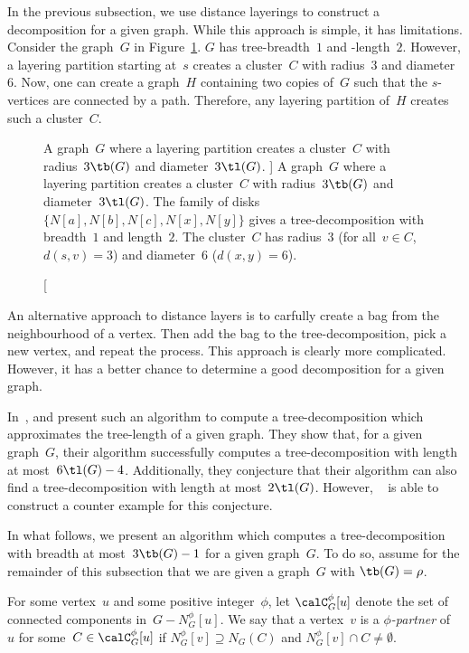 In the previous subsection, we use distance layerings to construct a decomposition for a given graph.
While this approach is simple, it has limitations.
Consider the graph~$G$ in Figure~\ref{fig:LayPartApprox}.
$G$ has tree-breadth~$1$ and -length~$2$.
However, a layering partition starting at~$s$ creates a cluster~$C$ with radius~$3$ and diameter~$6$.
Now, one can create a graph~$H$ containing two copies of~$G$ such that the $s$-vertices are connected by a path.
Therefore, any layering partition of~$H$ creates such a cluster~$C$.

\begin{figure}
    [htb]
    \centering
    
    \caption
    [%
        A graph~$G$ where a layering partition creates a cluster~$C$ with radius~$3 \tb(G)$ and diameter~$3 \tl(G)$.
    ]
    {
        A graph~$G$ where a layering partition creates a cluster~$C$ with radius~$3 \tb(G)$ and diameter~$3 \tl(G)$.
        The family of disks~$\big \{ N[a], N[b], N[c], N[x], N[y] \big \}$ gives a tree-decomposition with breadth~$1$ and length~$2$.
        The cluster~$C$ has radius~$3$ (for all~$v \in C$, $d(s, v) = 3$) and diameter~$6$ ($d(x, y) = 6$).
    }
    \label{fig:LayPartApprox}
\end{figure}

An alternative approach to distance layers is to carfully create a bag from the neighbourhood of a vertex.
Then add the bag to the tree-decomposition, pick a new vertex, and repeat the process.
This approach is clearly more complicated.
However, it has a better chance to determine a good decomposition for a given graph.

In~\cite{DourisGavoil2007},  and  present such an algorithm to compute a tree-decomposition which approximates the tree-length of a given graph.
They show that, for a given graph~$G$, their algorithm successfully computes a tree-decomposition with length at most~$6 \tl(G) - 4$.
Additionally, they conjecture that their algorithm can also find a tree-decomposition with length at most~$2 \tl(G)$.
However, ~\cite{Yancey2014} is able to construct a counter example for this conjecture.

In what follows, we present an algorithm which computes a tree-decomposition with breadth at most~$3 \tb(G) - 1$ for a given graph~$G$.
To do so, assume for the remainder of this subsection that we are given a graph~$G$ with $\tb(G) = \rho$.

For some vertex~$u$ and some positive integer~$\phi$, let $\calC_G^\phi[u]$ denote the set of connected components in~$G - N_G^\phi[u]$.
We say that a vertex~$v$ is a \emph{\( \phi \)-partner} of~$u$ for some~$C \in \calC_G^\phi[u]$ if $N_G^\phi[v] \supseteq N_G(C)$ and $N_G^\phi[v] \cap C \neq \emptyset$.

